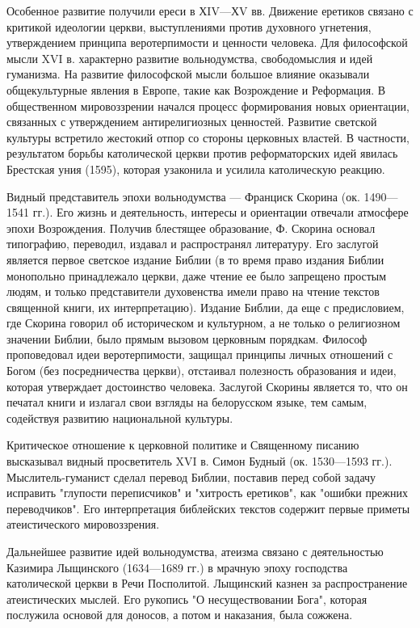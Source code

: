 Особенное развитие получили ереси в ХIV—ХV вв. Движение еретиков связано с критикой идеологии церкви, выступлениями против духовного угнетения, утверждением принципа веротерпимости и ценности человека. Для философской мысли XVI в. характерно развитие вольнодумства, свободомыслия и идей гуманизма. На развитие философской мысли большое влияние оказывали общекультурные явления в Европе, такие как Возрождение и Реформация. В общественном мировоззрении начался процесс формирования новых ориентации, связанных с утверждением антирелигиозных ценностей. Развитие светской культуры встретило жестокий отпор со стороны церковных властей. В частности, результатом борьбы католической церкви против реформаторских идей явилась Брестская уния (1595), которая узаконила и усилила католическую реакцию.

Видный представитель эпохи вольнодумства — Франциск Скорина (ок. 1490—1541 гг.). Его жизнь и деятельность, интересы и ориентации отвечали атмосфере эпохи Возрождения. Получив блестящее образование, Ф. Скорина основал типографию, переводил, издавал и распространял литературу. Его заслугой является первое светское издание Библии (в то время право издания Библии монопольно принадлежало церкви, даже чтение ее было запрещено простым людям, и только представители духовенства имели право на чтение текстов священной книги, их интерпретацию). Издание Библии, да еще с предисловием, где Скорина говорил об историческом и культурном, а не только о религиозном значении Библии, было прямым вызовом церковным порядкам. Философ проповедовал идеи веротерпимости, защищал принципы личных отношений с Богом (без посредничества церкви), отстаивал полезность образования и идеи, которая утверждает достоинство человека. Заслугой Скорины является то, что он печатал книги и излагал свои взгляды на белорусском языке, тем самым, содействуя развитию национальной культуры.

Критическое отношение к церковной политике и Священному писанию высказывал видный просветитель XVI в. Симон Будный (ок. 1530—1593 гг.). Мыслитель-гуманист сделал перевод Библии, поставив перед собой задачу исправить "глупости переписчиков" и "хитрость еретиков", как "ошибки прежних переводчиков". Его интерпретация библейских текстов содержит первые приметы атеистического мировоззрения.

Дальнейшее развитие идей вольнодумства, атеизма связано с деятельностью Казимира Лыщинского (1634—1689 гг.) в мрачную эпоху господства католической церкви в Речи Посполитой. Лыщинский казнен за распространение атеистических мыслей. Его рукопись "О несуществовании Бога", которая послужила основой для доносов, а потом и наказания, была сожжена.

